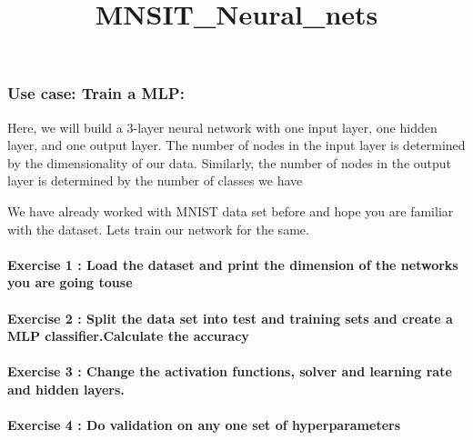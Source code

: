 \documentclass[11pt]{article}
\title{MNSIT\_Neural\_nets}
\begin{document}
    
    
    \maketitle
    
    

    
    \subsubsection{Use case: Train a MLP:}\label{use-case-train-a-mlp}

Here, we will build a 3-layer neural network with one input layer, one
hidden layer, and one output layer. The number of nodes in the input
layer is determined by the dimensionality of our data. Similarly, the
number of nodes in the output layer is determined by the number of
classes we have

We have already worked with MNIST data set before and hope you are
familiar with the dataset. Lets train our network for the same.

\paragraph{Exercise 1 : Load the dataset and print the dimension of the
networks you are going
touse}\label{exercise-1-load-the-dataset-and-print-the-dimension-of-the-networks-you-are-going-touse}

\paragraph{Exercise 2 : Split the data set into test and training sets
and create a MLP classifier.Calculate the
accuracy}\label{exercise-2-split-the-data-set-into-test-and-training-sets-and-create-a-mlp-classifier.calculate-the-accuracy}

\paragraph{Exercise 3 : Change the activation functions, solver and
learning rate and hidden
layers.}\label{exercise-3-change-the-activation-functions-solver-and-learning-rate-and-hidden-layers.}

\paragraph{Exercise 4 : Do validation on any one set of
hyperparameters}\label{exercise-4-do-validation-on-any-one-set-of-hyperparameters}
\end{document}
